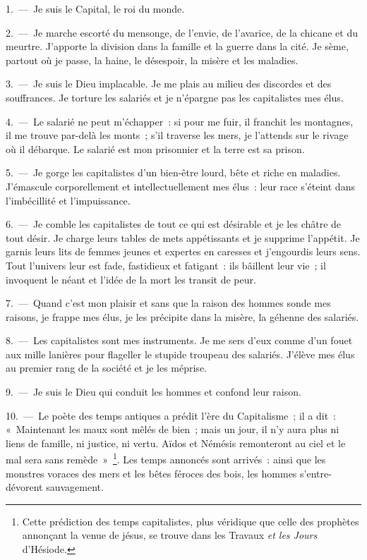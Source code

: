\documentclass[french,twoside]{book} %
\begin{document}
1. — Je suis le Capital, le roi du monde.\par
2. — Je marche escorté du mensonge, de l’envie, de l’avarice, de la chicane et du meurtre. J'apporte la division dans la famille et la guerre dans la cité. Je sème, partout où je passe, la haine, le désespoir, la misère et les maladies.\par
3. — Je suis le Dieu implacable. Je me plais au milieu des discordes et des souffrances. Je torture les salariés et je n’épargne pas les capitalistes mes élus.\par
4. — Le salarié ne peut m’échapper : si pour me fuir, il franchit les montagnes, il me trouve par-delà les monts ; s’il traverse les mers, je l’attends sur le rivage où il débarque. Le salarié est mon prisonnier et la terre est sa prison.\par
5. — Je gorge les capitalistes d’un bien-être lourd, bête et riche en maladies. J'émascule corporellement et intellectuellement mes élus : leur race s’éteint dans l’imbécillité et l’impuissance.\par
6. — Je comble les capitalistes de tout ce qui est désirable et je les châtre de tout désir. Je charge leurs tables de mets appétissants et je supprime l’appétit. Je garnis leurs lits de femmes jeunes et expertes en caresses et j’engourdis leurs sens. Tout l’univers leur est fade, fastidieux et fatigant : ils bâillent leur vie ; il invoquent le néant et l’idée de la mort les transit de peur.\par
7. — Quand c’est mon plaisir et sans que la raison des hommes sonde mes raisons, je frappe mes élus, je les précipite dans la misère, la géhenne des salariés.\par
8. — Les capitalistes sont mes instruments. Je me sers d’eux comme d’un fouet aux mille lanières pour flageller le stupide troupeau des salariés. J'élève mes élus au premier rang de la société et je les méprise.\par
9. — Je suis le Dieu qui conduit les hommes et confond leur raison.\par
10. — Le poète des temps antiques a prédit l’ère du Capitalisme ; il a dit : « Maintenant les maux sont mêlés de bien ; mais un jour, il n’y aura plus ni liens de famille, ni justice, ni vertu. Aïdos et Némésis remonteront au ciel et le mal sera sans remède » \footnote{Cette prédiction des temps capitalistes, plus véridique que celle des prophètes annonçant la venue de jésus, se trouve dans les Travaux \emph{et les Jours} d’Hésiode.}. Les temps annoncés sont arrivés : ainsi que les monstres voraces des mers et les bêtes féroces des bois, les hommes s’entre-dévorent sauvagement.\par
\end{document}
